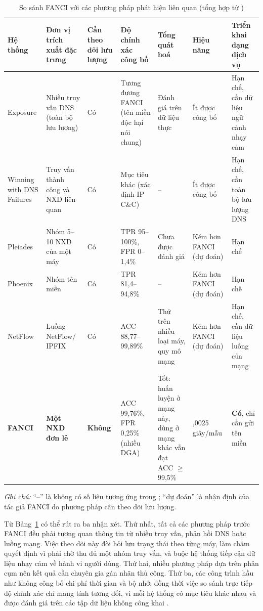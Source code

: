 \begin{table}[H]
\centering
\caption{So sánh FANCI với các phương pháp phát hiện liên quan (tổng hợp từ \cite{schuppen2018fanci})}
\label{tab:so-sanh-phuong-phap}
\renewcommand{\tabularxcolumn}[1]{>{\footnotesize}m{#1}}
\begin{tabularx}{\textwidth}{|>{\raggedright\arraybackslash\footnotesize}m{2cm}|>{\raggedright\arraybackslash}X|>{\raggedright\arraybackslash\footnotesize}m{1.4cm}|*{4}{>{\raggedright\arraybackslash}X|}}
\hline
\rowcolor{LightCyan}
\textbf{Hệ thống} & \textbf{Đơn vị trích xuất đặc trưng} & \textbf{Cần theo dõi lưu lượng} & \textbf{Độ chính xác công bố} & \textbf{Tổng quát hoá} & \textbf{Hiệu năng} & \textbf{Triển khai dạng dịch vụ} \\
\hline
Exposure & Nhiều truy vấn DNS (toàn bộ lưu lượng) & Có & Tương đương FANCI (tên miền độc hại nói chung) & Đánh giá trên dữ liệu thực & Ít được công bố & Hạn chế, cần dữ liệu ngữ cảnh nhạy cảm \\
\hline
Winning with DNS Failures & Truy vấn thành công và NXD liên quan & Có & Mục tiêu khác (xác định IP C\&C) & -- & Ít được công bố & Hạn chế, cần toàn bộ lưu lượng DNS \\
\hline
Pleiades & Nhóm 5--10 NXD của một máy & Có & TPR 95--100\%, FPR 0--1,4\% & Chưa được đánh giá & Kém hơn FANCI (dự đoán) & Hạn chế \\
\hline
Phoenix & Nhóm tên miền & Có & TPR 81,4--94,8\% & -- & Kém hơn FANCI (dự đoán) & Hạn chế \\
\hline
NetFlow & Luồng NetFlow/ IPFIX & Có & ACC 88,77--99,89\% & Thử trên nhiều loại máy, quy mô mạng & Kém hơn FANCI (dự đoán) & Hạn chế, cần dữ liệu luồng của mạng \\
\hline
\textbf{FANCI} & \textbf{Một NXD đơn lẻ} & \textbf{Không} & ACC 99,76\%, FPR 0,25\% (nhiều DGA) & Tốt: huấn luyện ở mạng này, dùng ở mạng khác vẫn đạt ACC $\geq$ 99,5\% & 0,0025 giây/mẫu & \textbf{Có}, chỉ cần gửi tên miền \\
\hline
\end{tabularx}

\vspace{2pt}
{\footnotesize \textit{Ghi chú:} ``--'' là không có số liệu tương ứng trong \cite{schuppen2018fanci}; ``dự đoán'' là nhận định của tác giả FANCI do phương pháp cần theo dõi lưu lượng.}
\end{table}

Từ Bảng~\ref{tab:so-sanh-phuong-phap} có thể rút ra ba nhận xét. Thứ nhất, tất cả các phương pháp trước FANCI đều phải tương quan thông tin từ nhiều truy vấn, phản hồi DNS hoặc luồng mạng. Việc theo dõi này đòi hỏi lưu trạng thái theo từng máy, làm chậm quyết định vì phải chờ thu đủ một nhóm truy vấn, và buộc hệ thống tiếp cận dữ liệu nhạy cảm về hành vi người dùng. Thứ hai, nhiều phương pháp dựa trên phân cụm nên kết quả cần chuyên gia gán nhãn thủ công. Thứ ba, các công trình hầu như không công bố chi phí thời gian và bộ nhớ; đồng thời việc so sánh trực tiếp độ chính xác chỉ mang tính tương đối, vì mỗi hệ thống có mục tiêu khác nhau và được đánh giá trên các tập dữ liệu không công khai \cite{schuppen2018fanci}.

